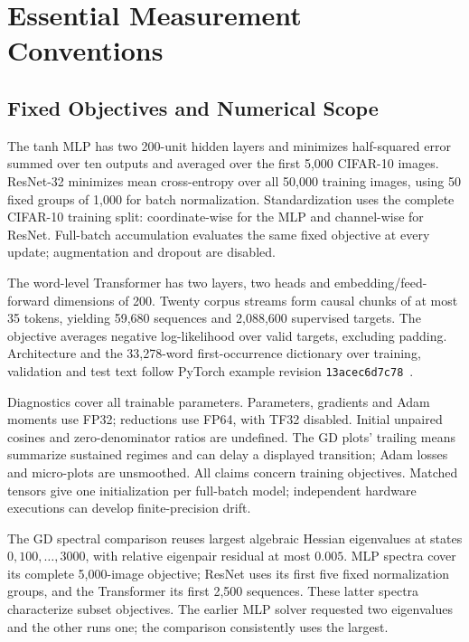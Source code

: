 \section{Essential Measurement Conventions}
\label{appendix:gd-raw-alignment}

\subsection{Fixed Objectives and Numerical Scope}

The tanh MLP has two 200-unit hidden layers and minimizes half-squared
error summed over ten outputs and averaged over the first 5,000 CIFAR-10 images.
ResNet-32 minimizes mean cross-entropy over all 50,000 training images,
using 50 fixed groups of 1,000 for batch normalization. Standardization
uses the complete CIFAR-10 training split: coordinate-wise for the MLP
and channel-wise for ResNet. Full-batch accumulation evaluates the same
fixed objective at every update; augmentation and dropout are disabled.

The word-level Transformer has two layers, two heads and embedding/feed-forward
dimensions of 200. Twenty corpus streams form causal chunks of at most
35 tokens, yielding 59,680 sequences and 2,088,600 supervised targets.
The objective averages negative log-likelihood over valid targets, excluding
padding. Architecture and the 33,278-word first-occurrence dictionary over
training, validation and test text follow PyTorch example revision
\texttt{13acec6d7c78}~\cite{pytorchWordLanguageModelPinned}.

Diagnostics cover all trainable parameters. Parameters, gradients and Adam
moments use FP32; reductions use FP64, with TF32 disabled. Initial unpaired
cosines and zero-denominator ratios are undefined. The GD plots' trailing
means summarize sustained regimes and can delay a displayed transition;
Adam losses and micro-plots are unsmoothed. All claims concern training
objectives. Matched tensors give one initialization per full-batch model;
independent hardware executions can develop finite-precision drift.

The GD spectral comparison reuses largest algebraic Hessian eigenvalues
at states $0,100,\ldots,3000$, with relative eigenpair residual at most
$0.005$. MLP spectra cover its complete 5,000-image objective; ResNet
uses its first five fixed normalization groups, and the Transformer
its first 2,500 sequences. These latter spectra characterize subset
objectives. The earlier MLP solver requested two eigenvalues and the
other runs one; the comparison consistently uses the largest.

